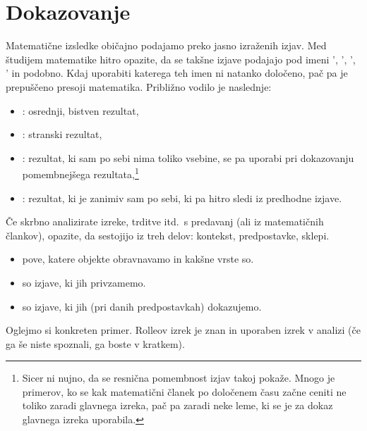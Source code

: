 \chapter{Dokazovanje}\label{POGLAVJE: Dokazovanje}

        Matematične izsledke običajno podajamo preko jasno izraženih izjav. Med študijem matematike hitro opazite, da se takšne izjave podajajo pod imeni ', ', ', ' in podobno. Kdaj uporabiti katerega teh imen ni natanko določeno, pač pa je prepuščeno presoji matematika. Približno vodilo je naslednje:
        \begin{itemize}
                \item
                        : osrednji, bistven rezultat,
                \item
                        : stranski rezultat,
                \item
                        : rezultat, ki sam po sebi nima toliko vsebine, se pa uporabi pri dokazovanju pomembnejšega rezultata,\footnote{Sicer ni nujno, da se resnična pomembnost izjav takoj pokaže. Mnogo je primerov, ko se kak matematični članek po določenem času začne ceniti ne toliko zaradi glavnega izreka, pač pa zaradi neke leme, ki se je za dokaz glavnega izreka uporabila.}
                \item
                        : rezultat, ki je zanimiv sam po sebi, ki pa hitro sledi iz predhodne izjave.
        \end{itemize}

        Če skrbno analizirate izreke, trditve itd.~s predavanj (ali iz matematičnih člankov), opazite, da sestojijo iz treh delov: kontekst, predpostavke, sklepi.
        \begin{itemize}
                \item
                         pove, katere objekte obravnavamo in kakšne vrste so.
                \item
                         so izjave, ki jih privzamemo.
                \item
                         so izjave, ki jih (pri danih predpostavkah) dokazujemo.
        \end{itemize}

        Oglejmo si konkreten primer. Rolleov izrek je znan in uporaben izrek v analizi (če ga še niste spoznali, ga boste v kratkem).

